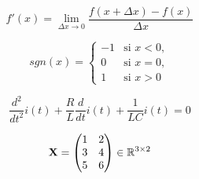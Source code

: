 \begin{equation*}
f'(x)=\lim_{\Delta x \to 0} \frac{f(x+\Delta x)-f(x)}{\Delta x}
\end{equation*}

\begin{equation*}
	sgn(x) = \begin{cases}
	-1 & \text{si } x<0,\\
	0 & \text{si } x=0,\\
        1 & \text{si } x>0
	\end{cases}
\end{equation*}

\begin{equation*}
	\frac{d^2}{dt^2}i(t)+\frac{R}{L}\frac{d}{dt}i(t)+\frac{1}{LC}i(t)=0
\end{equation*}

\begin{equation*}
    \mathbf{X} = 
            \begin{pmatrix}
                1&2\\
                3&4\\
                5&6
            \end{pmatrix}\in \mathbb{R}^{3\times 2}
\end{equation*}

